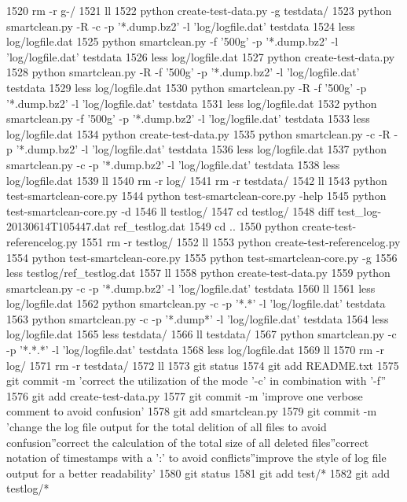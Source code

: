  1520  rm -r g-/
 1521  ll
 1522  python create-test-data.py -g testdata/
 1523  python smartclean.py -R -c -p '*.dump.bz2' -l 'log/logfile.dat' testdata
 1524  less log/logfile.dat 
 1525  python smartclean.py -f '500g' -p '*.dump.bz2' -l 'log/logfile.dat' testdata
 1526  less log/logfile.dat 
 1527  python create-test-data.py
 1528  python smartclean.py -R -f '500g' -p '*.dump.bz2' -l 'log/logfile.dat' testdata
 1529  less log/logfile.dat 
 1530  python smartclean.py -R -f '500g' -p '*.dump.bz2' -l 'log/logfile.dat' testdata
 1531  less log/logfile.dat 
 1532  python smartclean.py -f '500g' -p '*.dump.bz2' -l 'log/logfile.dat' testdata
 1533  less log/logfile.dat 
 1534  python create-test-data.py
 1535  python smartclean.py -c -R -p '*.dump.bz2' -l 'log/logfile.dat' testdata
 1536  less log/logfile.dat 
 1537  python smartclean.py -c -p '*.dump.bz2' -l 'log/logfile.dat' testdata
 1538  less log/logfile.dat 
 1539  ll
 1540  rm -r log/
 1541  rm -r testdata/
 1542  ll
 1543  python test-smartclean-core.py 
 1544  python test-smartclean-core.py -help
 1545  python test-smartclean-core.py -d
 1546  ll testlog/
 1547  cd testlog/
 1548  diff test_log-20130614T105447.dat ref_testlog.dat 
 1549  cd ..
 1550  python create-test-referencelog.py 
 1551  rm -r testlog/
 1552  ll
 1553  python create-test-referencelog.py 
 1554  python test-smartclean-core.py
 1555  python test-smartclean-core.py -g
 1556  less testlog/ref_testlog.dat 
 1557  ll
 1558  python create-test-data.py 
 1559  python smartclean.py -c -p '*.dump.bz2' -l 'log/logfile.dat' testdata
 1560  ll
 1561  less log/logfile.dat 
 1562  python smartclean.py -c -p '*.*' -l 'log/logfile.dat' testdata
 1563  python smartclean.py -c -p '*.dump*' -l 'log/logfile.dat' testdata
 1564  less log/logfile.dat 
 1565  less testdata/
 1566  ll testdata/
 1567  python smartclean.py -c -p '*.*.*' -l 'log/logfile.dat' testdata
 1568  less log/logfile.dat 
 1569  ll
 1570  rm -r log/
 1571  rm -r testdata/
 1572  ll
 1573  git status
 1574  git add README.txt
 1575  git commit -m 'correct the utilization of the mode '-c' in combination with '-f''
 1576  git add create-test-data.py
 1577  git commit -m 'improve one verbose comment to avoid confusion'
 1578  git add smartclean.py
 1579  git commit -m 'change the log file output for the total delition of all files to avoid confusion''correct the calculation of the total size of all deleted files''correct notation of timestamps with a ':' to avoid conflicts''improve the style of log file output for a better readability'
 1580  git status
 1581  git add test/*
 1582  git add testlog/*
